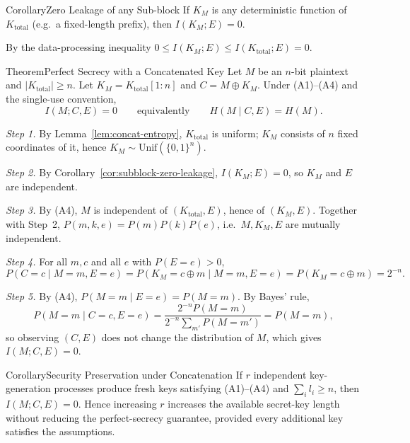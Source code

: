 \begin{statementB}{Corollary}{Zero Leakage of any Sub-block}\label{cor:subblock-zero-leakage}
If $K_M$ is any deterministic function of $K_{\mathrm{total}}$ (e.g.\ a fixed-length prefix), then $I(K_M;E)=0$.
\end{statementB}
\begin{proofB}
By the data-processing inequality $0\le I(K_M;E)\le I(K_{\mathrm{total}};E)=0$.
\end{proofB}

\begin{statementB}{Theorem}{Perfect Secrecy with a Concatenated Key}\label{thm:concat-otp}
Let $M$ be an $n$-bit plaintext and $|K_{\mathrm{total}}|\ge n$. Let $K_M=K_{\mathrm{total}}[1:n]$ and $C=M\oplus K_M$. Under (A1)--(A4) and the single-use convention,
\[
\boxed{I(M;C,E)=0}\qquad\text{equivalently}\qquad \boxed{H(M\mid C,E)=H(M)}.
\]
\end{statementB}
\begin{proofB}
\emph{Step 1.} By Lemma~\ref{lem:concat-entropy}, $K_{\mathrm{total}}$ is uniform; $K_M$ consists of $n$ fixed coordinates of it, hence $K_M\sim\mathrm{Unif}(\{0,1\}^n)$.

\emph{Step 2.} By Corollary~\ref{cor:subblock-zero-leakage}, $I(K_M;E)=0$, so $K_M$ and $E$ are independent.

\emph{Step 3.} By (A4), $M$ is independent of $(K_{\mathrm{total}},E)$, hence of $(K_M,E)$. Together with Step~2, $P(m,k,e)=P(m)P(k)P(e)$, i.e.\ $M,K_M,E$ are mutually independent.

\emph{Step 4.} For all $m,c$ and all $e$ with $P(E=e)>0$,
\[
P(C=c\mid M=m,E=e)=P(K_M=c\oplus m\mid M=m,E=e)=P(K_M=c\oplus m)=2^{-n}.
\]

\emph{Step 5.} By (A4), $P(M=m\mid E=e)=P(M=m)$. By Bayes' rule,
\[
P(M=m\mid C=c,E=e)=\frac{2^{-n}P(M=m)}{2^{-n}\sum_{m'}P(M=m')}=P(M=m),
\]
so observing $(C,E)$ does not change the distribution of $M$, which gives $I(M;C,E)=0$.
\end{proofB}

\begin{statementB}{Corollary}{Security Preservation under Concatenation}\label{cor:concat-security}
If $r$ independent key-generation processes produce fresh keys satisfying (A1)--(A4) and $\sum_i l_i\ge n$, then $I(M;C,E)=0$. Hence increasing $r$ increases the available secret-key length without reducing the perfect-secrecy guarantee, provided every additional key satisfies the assumptions.
\end{statementB}

